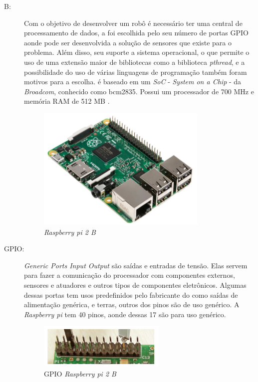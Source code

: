 \begin{description}
\item[ B:] Com o objetivo de desenvolver um robô é necessário ter uma
central de processamento de dados, a \rasp  foi escolhida pelo seu número de
portas GPIO aonde pode ser desenvolvida a solução de sensores que existe
para o problema. Além disso, seu suporte a sistema operacional, o que permite
o uso de uma extensão maior de bibliotecas como a biblioteca \textit{pthread},
e a possibilidade do uso de várias linguagens de programação também foram motivos
para a escolha. \rasp é baseado em um \textit{SoC} - \textit{System on a Chip} -
da \textit{Broadcom}, conhecido como \textsf{bcm2835}. Possui um processador
de 700 MHz e memória RAM de 512 MB \cite{raspfoundation2014}.
\par
\begin{figure}[h]
  \centering
  \includegraphics[width=0.8\textwidth]{figures/rpi2b.jpg}
  \caption{\textit{Raspberry pi 2 B} \cite{raspfoundation2016}}
  \label{fig:raspberry2b}
\end{figure}
\FloatBarrier

\item[GPIO:] \textit{Generic Ports Input Output} são saídas e entradas de tensão.
Elas servem para fazer a comunicação do processador com componentes externos,
sensores e atuadores e outros tipos de componentes eletrônicos. Algumas dessas
portas tem usos predefinidos pelo fabricante do \hardware como saídas de
alimentação genérica, e terras, outros dos pinos são de uso genérico. A
\textit{Raspberry pi} tem 40 pinos, aonde dessas 17 são para uso genérico.
\par
\begin{figure}[h]
  \centering
  \includegraphics[width=0.6\textwidth]{figures/gpio.png}
  \caption{GPIO \textit{Raspberry pi 2 B} \cite{raspfoundationgpio2016}}
  \label{fig:raspberry2b}
\end{figure}
\FloatBarrier


\end{description}
